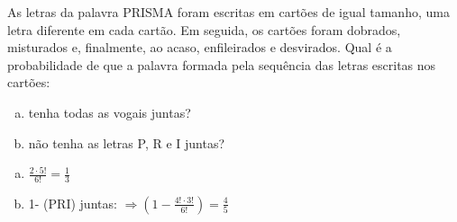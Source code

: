 \begin{ex}
As letras da palavra PRISMA foram escritas em cartões de igual tamanho, uma letra diferente em cada cartão. Em seguida, os cartões foram dobrados, misturados e, finalmente, ao acaso, enfileirados e desvirados. Qual é a probabilidade de que a palavra formada pela sequência das letras escritas nos cartões:
   \begin{enumerate}[(a)]
   \item tenha todas as vogais juntas?
   \item não tenha as letras P, R e I juntas?
   \end{enumerate}
     \begin{sol}
       \phantom{A} 
   \begin{enumerate} [(a)]
       \item $\frac{2\cdot5!}{6!}=\frac{1}{3}$
       \item 1- (PRI) juntas: $\Longrightarrow (1-\frac{4!\cdot3!}{6!})=\frac{4}{5}$
   
       
   \end{enumerate}
     \end{sol}
\end{ex}